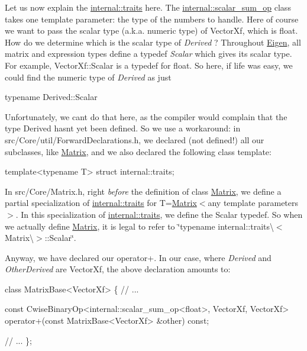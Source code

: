 Let us now explain the \hyperlink{struct_eigen_1_1internal_1_1traits}{internal\+::traits} here. The \hyperlink{struct_eigen_1_1internal_1_1scalar__sum__op}{internal\+::scalar\+\_\+sum\+\_\+op} class takes one template parameter\+: the type of the numbers to handle. Here of course we want to pass the scalar type (a.\+k.\+a. numeric type) of Vector\+Xf, which is {\ttfamily float}. How do we determine which is the scalar type of {\itshape Derived} ? Throughout \hyperlink{namespace_eigen}{Eigen}, all matrix and expression types define a typedef {\itshape Scalar} which gives its scalar type. For example, Vector\+Xf\+::\+Scalar is a typedef for {\ttfamily float}. So here, if life was easy, we could find the numeric type of {\itshape Derived} as just 
\begin{DoxyCode}
\textcolor{keyword}{typename} Derived::Scalar
\end{DoxyCode}
 Unfortunately, we can\textquotesingle{}t do that here, as the compiler would complain that the type Derived hasn\textquotesingle{}t yet been defined. So we use a workaround\+: in src/\+Core/util/\+Forward\+Declarations.\+h, we declared (not defined!) all our subclasses, like \hyperlink{group___core___module_class_eigen_1_1_matrix}{Matrix}, and we also declared the following class template\+: 
\begin{DoxyCode}
\textcolor{keyword}{template}<\textcolor{keyword}{typename} T> \textcolor{keyword}{struct }internal::traits;
\end{DoxyCode}
 In src/\+Core/\+Matrix.\+h, right {\itshape before} the definition of class \hyperlink{group___core___module_class_eigen_1_1_matrix}{Matrix}, we define a partial specialization of \hyperlink{struct_eigen_1_1internal_1_1traits}{internal\+::traits} for T=\hyperlink{group___core___module_class_eigen_1_1_matrix}{Matrix}$<$any template parameters$>$. In this specialization of \hyperlink{struct_eigen_1_1internal_1_1traits}{internal\+::traits}, we define the Scalar typedef. So when we actually define \hyperlink{group___core___module_class_eigen_1_1_matrix}{Matrix}, it is legal to refer to \char`\"{}typename internal\+::traits\textbackslash{}$<$\+Matrix\textbackslash{}$>$\+::\+Scalar\char`\"{}.

Anyway, we have declared our operator+. In our case, where {\itshape Derived} and {\itshape Other\+Derived} are Vector\+Xf, the above declaration amounts to\+: 
\begin{DoxyCode}
\textcolor{keyword}{class }MatrixBase<VectorXf>
\{
  \textcolor{comment}{// ...}

  \textcolor{keyword}{const} CwiseBinaryOp<internal::scalar\_sum\_op<float>, VectorXf, VectorXf>
  operator+(\textcolor{keyword}{const} MatrixBase<VectorXf> &other) \textcolor{keyword}{const};

  \textcolor{comment}{// ...}
\};
\end{DoxyCode}


